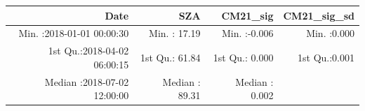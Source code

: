 \documentclass[
  10pt,
  a4paper,oneside]{article}
\begin{document}
\begin{longtable}[]{@{}rrrr@{}}
\toprule
\begin{minipage}[b]{0.33\columnwidth}\raggedleft
Date\strut
\end{minipage} & \begin{minipage}[b]{0.19\columnwidth}\raggedleft
SZA\strut
\end{minipage} & \begin{minipage}[b]{0.19\columnwidth}\raggedleft
CM21\_sig\strut
\end{minipage} & \begin{minipage}[b]{0.19\columnwidth}\raggedleft
CM21\_sig\_sd\strut
\end{minipage}\tabularnewline
\midrule
\endhead
\begin{minipage}[t]{0.33\columnwidth}\raggedleft
Min. :2018-01-01 00:00:30\strut
\end{minipage} & \begin{minipage}[t]{0.19\columnwidth}\raggedleft
Min. : 17.19\strut
\end{minipage} & \begin{minipage}[t]{0.19\columnwidth}\raggedleft
Min. :-0.006\strut
\end{minipage} & \begin{minipage}[t]{0.19\columnwidth}\raggedleft
Min. :0.000\strut
\end{minipage}\tabularnewline
\begin{minipage}[t]{0.33\columnwidth}\raggedleft
1st Qu.:2018-04-02 06:00:15\strut
\end{minipage} & \begin{minipage}[t]{0.19\columnwidth}\raggedleft
1st Qu.: 61.84\strut
\end{minipage} & \begin{minipage}[t]{0.19\columnwidth}\raggedleft
1st Qu.: 0.000\strut
\end{minipage} & \begin{minipage}[t]{0.19\columnwidth}\raggedleft
1st Qu.:0.001\strut
\end{minipage}\tabularnewline
\begin{minipage}[t]{0.33\columnwidth}\raggedleft
Median :2018-07-02 12:00:00\strut
\end{minipage} & \begin{minipage}[t]{0.19\columnwidth}\raggedleft
Median : 89.31\strut
\end{minipage} & \begin{minipage}[t]{0.19\columnwidth}\raggedleft
Median : 0.002\strut
\end{minipage} & \begin{minipage}[t]{0.19\columnwidth}\raggedleft

\end{minipage}
\end{longtable}
\end{document}
